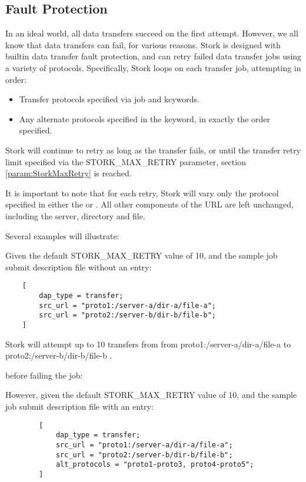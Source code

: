 \subsection{\label{sec:Stork-Fault-Protection}Fault Protection}
In an ideal world, all data transfers succeed on the first attempt.  However,
we all know that data transfers can fail, for various reasons.  Stork is
designed with builtin data transfer fault protection, and can retry failed data
transfer jobs using a variety of protocols.  Specifically, Stork loops on each
transfer job, attempting in order:
\begin{itemize}
    \item Transfer protocols specified via job  and
         keywords.
    \item Any alternate protocols specified in the 
    keyword, in exactly the order specified.
\end{itemize}

Stork will continue to retry as long as the transfer fails, or until the 
transfer retry limit specified via the 
\textsc{STORK\_MAX\_RETRY} parameter, section
\ref{param:StorkMaxRetry} is reached.  

It is important to note that for each retry, Stork will vary only the protocol
specified in either the  or .  All other
components of the URL are left unchanged, including the server, directory and
file.

Several examples will illustrate:

Given the default 
\textsc{STORK\_MAX\_RETRY} value of 10, and the sample job submit description
file without an  entry:
\begin{verbatim}
    [
        dap_type = transfer;
        src_url = "proto1:/server-a/dir-a/file-a";
        src_url = "proto2:/server-b/dir-b/file-b";
    ]
\end{verbatim}

Stork will attempt up to 10 transfers from from 
			proto1:/server-a/dir-a/file-a
            to
			proto2:/server-b/dir-b/file-b .

before failing the job:

However, given the default 
\textsc{STORK\_MAX\_RETRY} value of 10, and the sample job submit description
file with an  entry:
	\begin{verbatim}
		[
			dap_type = transfer;
			src_url = "proto1:/server-a/dir-a/file-a";
			src_url = "proto2:/server-b/dir-b/file-b";
			alt_protocols = "proto1-proto3, proto4-proto5";
		]
	\end{verbatim}

